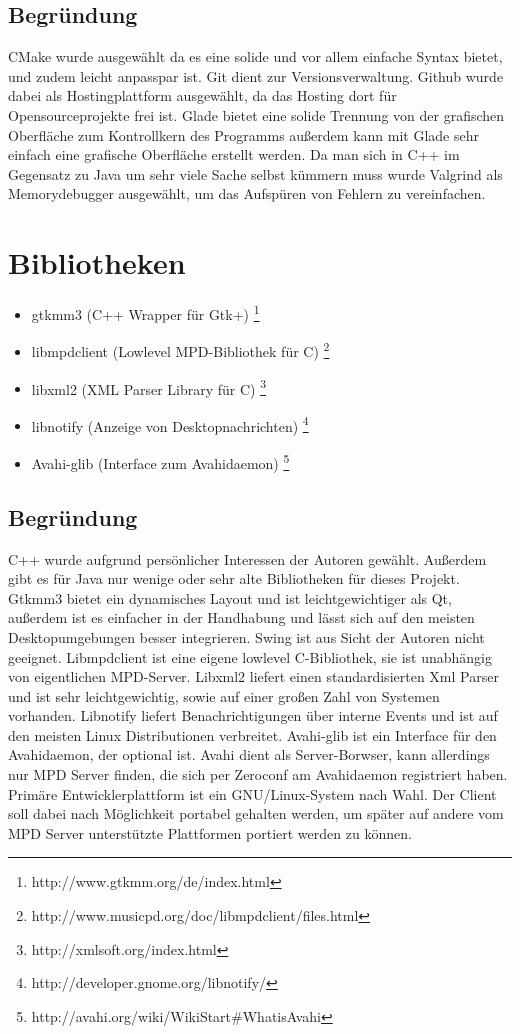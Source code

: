 \subsection{Begründung}
CMake wurde ausgewählt da es eine solide und vor allem einfache Syntax bietet, und zudem leicht anpasspar ist. 
Git dient zur Versionsverwaltung. Github wurde dabei als Hostingplattform ausgewählt, da das Hosting dort für Opensourceprojekte
frei ist. Glade bietet eine solide Trennung von der grafischen  Oberfläche zum Kontrollkern des Programms außerdem kann mit Glade sehr
einfach eine grafische Oberfläche erstellt werden. Da man sich in C++ im Gegensatz zu Java um sehr viele Sache selbst kümmern muss
wurde Valgrind als Memorydebugger ausgewählt, um das Aufspüren von Fehlern zu vereinfachen.
\section{Bibliotheken}
\begin{itemize}
\item gtkmm3 (C++ Wrapper für Gtk+) \footnote{http://www.gtkmm.org/de/index.html}
\item libmpdclient (Lowlevel MPD-Bibliothek für C) \footnote{http://www.musicpd.org/doc/libmpdclient/files.html}
\item libxml2 (XML Parser Library für C) \footnote{http://xmlsoft.org/index.html}
\item libnotify (Anzeige von Desktopnachrichten) \footnote{http://developer.gnome.org/libnotify/}
\item Avahi-glib (Interface zum Avahidaemon) \footnote{http://avahi.org/wiki/WikiStart\#WhatisAvahi}
\end{itemize}
\subsection{Begründung}
C++ wurde aufgrund persönlicher Interessen der Autoren gewählt. Außerdem gibt es für Java nur wenige
oder sehr alte Bibliotheken für dieses Projekt. Gtkmm3 bietet ein dynamisches Layout und ist
leichtgewichtiger als Qt, außerdem ist es einfacher in der Handhabung und lässt sich auf den meisten 
Desktopumgebungen besser integrieren. Swing ist aus Sicht der Autoren nicht geeignet.
Libmpdclient ist eine eigene lowlevel C-Bibliothek, sie ist unabhängig von eigentlichen MPD-Server.
Libxml2 liefert einen standardisierten Xml Parser und ist sehr leichtgewichtig, sowie auf einer großen Zahl von Systemen vorhanden.
Libnotify liefert Benachrichtigungen über interne Events und ist auf den meisten Linux
Distributionen verbreitet. Avahi-glib ist ein Interface für den Avahidaemon, der optional ist. Avahi 
dient als Server-Borwser, kann allerdings nur MPD Server finden, die sich per Zeroconf am Avahidaemon registriert
haben.
\\ 
Primäre Entwicklerplattform ist ein GNU/Linux-System nach Wahl. Der Client soll dabei nach Möglichkeit portabel gehalten werden, um später 
auf andere vom MPD Server unterstützte Plattformen portiert werden zu können.
